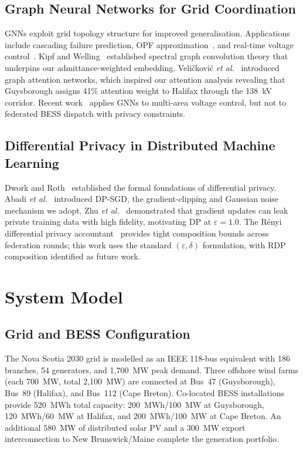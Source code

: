 \documentclass[journal]{IEEEtran}
\begin{document}
\subsection{Graph Neural Networks for Grid Coordination}

GNNs exploit grid topology structure for improved generalisation.
Applications include cascading failure prediction, OPF
approximation~\cite{farivar2013branch}, and real-time voltage
control~\cite{arnoldMPC2016}. Kipf and Welling~\cite{kipf2017gcn}
established spectral graph convolution theory that underpins our
admittance-weighted embedding. Veličković \textit{et
al.}~\cite{velickovic2018gat} introduced graph attention networks,
which inspired our attention analysis revealing that Guysborough
assigns 41\% attention weight to Halifax through the 138~kV corridor.
Recent work~\cite{wang2020safe} applies GNNs to multi-area voltage
control, but not to federated BESS dispatch with privacy constraints.

\subsection{Differential Privacy in Distributed Machine Learning}

Dwork and Roth~\cite{dwork2014algorithmic} established the formal
foundations of differential privacy. Abadi \textit{et al.}~\cite{abadi2016dp}
introduced DP-SGD, the gradient-clipping and Gaussian noise mechanism
we adopt. Zhu \textit{et al.}~\cite{zhu2019deep} demonstrated that
gradient updates can leak private training data with high fidelity,
motivating DP at $\varepsilon{=}1.0$. The Rényi differential privacy
accountant~\cite{mironov2017renyi} provides tight composition bounds
across federation rounds; this work uses the standard $(\varepsilon,\delta)$
formulation, with RDP composition identified as future work.

\section{System Model}

\subsection{Grid and BESS Configuration}

The Nova Scotia 2030 grid is modelled as an IEEE 118-bus equivalent
with 186 branches, 54 generators, and 1,700~MW peak demand. Three
offshore wind farms (each 700~MW, total 2,100~MW) are connected at
Bus~47 (Guysborough), Bus~89 (Halifax), and Bus~112 (Cape Breton).
Co-located BESS installations provide 520~MWh total capacity:
200~MWh/100~MW at Guysborough, 120~MWh/60~MW at Halifax, and
200~MWh/100~MW at Cape Breton. An additional 580~MW of distributed
solar PV and a 300~MW export interconnection to New Brunswick/Maine
complete the generation portfolio.
\end{document}
